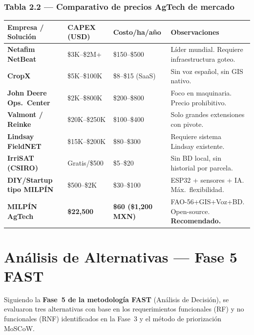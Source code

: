 \documentclass[12pt,letterpaper]{article}
\newcommand{\tH}[1]{\cellcolor{azulOscuro}\color{white}\bfseries\small #1}
\newcommand{\fA}{\rowcolor{azulFila}}
\newcommand{\fG}{\rowcolor{green!12!white}}
\begin{document}
\subsubsection*{Tabla 2.2 — Comparativo de precios AgTech de mercado}
\begin{tabularx}{\textwidth}{>{\small\bfseries}p{3.2cm}
    >{\small\centering\arraybackslash}p{2.8cm}
    >{\small\centering\arraybackslash}p{2.4cm} X}
\toprule
\tH{Empresa / Solución} & \tH{CAPEX (USD)} & \tH{Costo/ha/año} & \tH{Observaciones} \\
\midrule
Netafim NetBeat          & \$3K–\$2M+        & \$150–\$500         & Líder mundial. Requiere infraestructura goteo. \\
\fA CropX                & \$5K–\$100K       & \$8–\$15 (SaaS)     & Sin voz español, sin GIS nativo. \\
John Deere Ops.\ Center  & \$2K–\$800K       & \$200–\$800         & Foco en maquinaria. Precio prohibitivo. \\
\fA Valmont / Reinke     & \$20K–\$250K      & \$100–\$400         & Solo grandes extensiones con pivote. \\
Lindsay FieldNET         & \$15K–\$200K      & \$80–\$300          & Requiere sistema Lindsay existente. \\
\fA IrriSAT (CSIRO)      & Gratis/\$500      & \$5–\$20            & Sin BD local, sin historial por parcela. \\
DIY/Startup tipo MILPÍN  & \$500–\$2K        & \$30–\$100          & ESP32 + sensores + IA. Máx.\ flexibilidad. \\
\fG \textbf{MILPÍN AgTech} & \textbf{\$22{,}500} & \textbf{\$60 (\$1{,}200 MXN)} & FAO-56+GIS+Voz+BD. Open-source. \textbf{Recomendado.} \\
\bottomrule
\end{tabularx}

\newpage

\section{Análisis de Alternativas — Fase 5 FAST}

Siguiendo la \textbf{Fase~5 de la metodología FAST} (Análisis de Decisión), se evaluaron
tres alternativas con base en los requerimientos funcionales (RF) y no funcionales (RNF)
identificados en la Fase~3 y el método de priorización MoSCoW.
\end{document}
